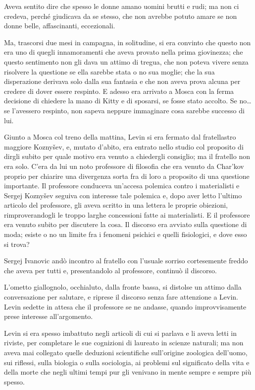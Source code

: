 Aveva sentito dire che spesso le donne amano uomini brutti e rudi; ma non ci credeva, perché giudicava da se stesso, che non avrebbe potuto amare se non donne belle, affascinanti, eccezionali. 

Ma, trascorsi due mesi in campagna, in solitudine, si era convinto che questo non era uno di quegli innamoramenti che aveva provato nella prima giovinezza; che questo sentimento non gli dava un attimo di tregua, che non poteva vivere senza risolvere la questione se ella sarebbe stata o no sua moglie; che la sua disperazione derivava solo dalla sua fantasia e che non aveva prova alcuna per credere di dover essere respinto. E adesso era arrivato a Mosca con la ferma decisione di chiedere la mano di Kitty e di sposarsi, se fosse stato accolto. Se no\ldots{} se l'avessero respinto, non sapeva neppure immaginare cosa sarebbe successo di lui. 

Giunto a Mosca col treno della mattina, Levin si era fermato dal fratellastro maggiore Koznyšev, e, mutato d'abito, era entrato nello studio col proposito di dirgli subito per quale motivo era venuto a chiedergli consiglio; ma il fratello non era solo. C'era da lui un noto professore di filosofia che era venuto da Char'kov proprio per chiarire una divergenza sorta fra di loro a proposito di una questione importante. Il professore conduceva un'accesa polemica contro i materialisti e Sergej Koznyšev seguiva con interesse tale polemica e, dopo aver letto l'ultimo articolo del professore, gli aveva scritto in una lettera le proprie obiezioni, rimproverandogli le troppo larghe concessioni fatte ai materialisti. E il professore era venuto subito per discutere la cosa. Il discorso era avviato sulla questione di moda; esiste o no un limite fra i fenomeni psichici e quelli fisiologici, e dove esso si trova? 

Sergej Ivanovic andò incontro al fratello con l'usuale sorriso cortesemente freddo che aveva per tutti e, presentandolo al professore, continuò il discorso. 

L'ometto giallognolo, occhialuto, dalla fronte bassa, si distolse un attimo dalla conversazione per salutare, e riprese il discorso senza fare attenzione a Levin. Levin sedette in attesa che il professore se ne andasse, quando improvvisamente prese interesse all'argomento. 

Levin si era spesso imbattuto negli articoli di cui si parlava e li aveva letti in riviste, per completare le sue cognizioni di laureato in scienze naturali; ma non aveva mai collegato quelle deduzioni scientifiche sull'origine zoologica dell'uomo, sui riflessi, sulla biologia o sulla sociologia, ai problemi sul significato della vita e della morte che negli ultimi tempi pur gli venivano in mente sempre e sempre più spesso. 

